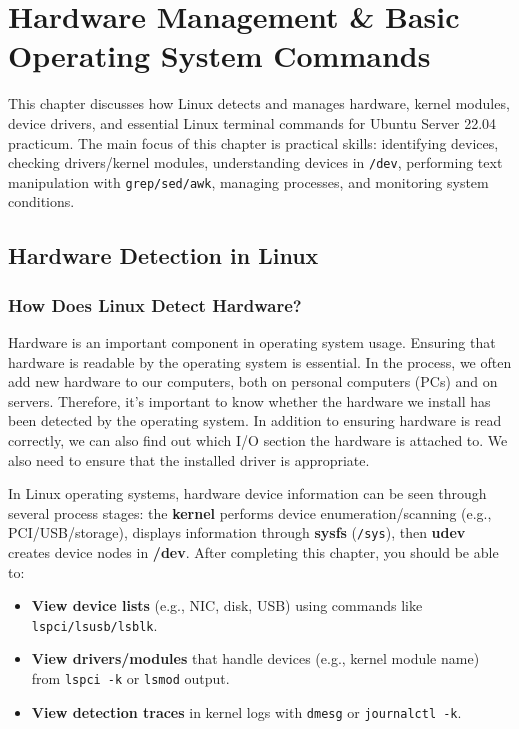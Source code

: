 
\chapter{Hardware Management \& Basic Operating System Commands}
\label{ch:hardware-and-basic-commands}

This chapter discusses how Linux detects and manages hardware, kernel modules,
device drivers, and essential Linux terminal commands for Ubuntu Server 22.04 practicum.
The main focus of this chapter is practical skills: identifying devices,
checking drivers/kernel modules, understanding devices in \texttt{/dev}, performing text manipulation
with \texttt{grep/sed/awk}, managing processes, and monitoring system conditions.

\section{Hardware Detection in Linux}
\label{sec:hardware-detection}

\subsection*{How Does Linux Detect Hardware?}
Hardware is an important component in operating system usage. Ensuring that hardware is readable by the operating system is essential. In the process, we often add new hardware to our computers, both on personal computers (PCs) and on servers. Therefore, it's important to know whether the hardware we install has been detected by the operating system. In addition to ensuring hardware is read correctly, we can also find out which I/O section the hardware is attached to. We also need to ensure that the installed driver is appropriate.

In Linux operating systems, hardware device information can be seen through several process stages: the
\textbf{kernel} performs device enumeration/scanning (e.g., PCI/USB/storage), displays information through \textbf{sysfs} (\texttt{/sys}),
then \textbf{udev} creates device nodes in \textbf{/dev}. After completing this chapter, you should be able to:
\begin{itemize}
    \item \textbf{View device lists} (e.g., NIC, disk, USB) using commands like \texttt{lspci/lsusb/lsblk}.
    \item \textbf{View drivers/modules} that handle devices (e.g., kernel module name) from \texttt{lspci -k} or \texttt{lsmod} output.
    \item \textbf{View detection traces} in kernel logs with \texttt{dmesg} or \texttt{journalctl -k}.
\end{itemize}

